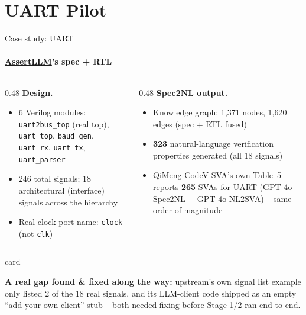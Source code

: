 \documentclass[aspectratio=169]{beamer}
\newenvironment{card}[1][\textwidth]{%
  \begin{beamercolorbox}[wd=#1,sep=8pt,rounded=true,shadow=false]{card}
}{%
  \end{beamercolorbox}
}
\begin{document}
\section{UART Pilot}

\begin{frame}{Case study: UART}
  \framesubtitle{\href{https://github.com/hkust-zhiyao/AssertLLM}{AssertLLM}'s spec + RTL}
  \begin{columns}[T]
    \begin{column}{0.48\textwidth}
      \textbf{Design.}
      \begin{itemize}
        \item 6 Verilog modules: \texttt{uart2bus\_top} (real top),
          \texttt{uart\_top}, \texttt{baud\_gen}, \texttt{uart\_rx},
          \texttt{uart\_tx}, \texttt{uart\_parser}
        \item 246 total signals; 18 architectural (interface) signals
          across the hierarchy
        \item Real clock port name: \texttt{clock} (not \texttt{clk})
      \end{itemize}
    \end{column}
    \begin{column}{0.48\textwidth}
      \textbf{Spec2NL output.}
      \begin{itemize}
        \item Knowledge graph: 1{,}371 nodes, 1{,}620 edges (spec $+$ RTL fused)
        \item \textbf{323} natural-language verification properties
          generated (all 18 signals)
        \item QiMeng-CodeV-SVA's own Table~5 reports \textbf{265} SVAs for
          UART (GPT-4o Spec2NL + GPT-4o NL2SVA) -- same order of magnitude
      \end{itemize}
    \end{column}
  \end{columns}
  \vspace{6pt}
  \begin{card}
    \scriptsize
    \textbf{A real gap found \& fixed along the way:} upstream's own
    signal list example only listed 2 of the 18 real signals, and its
    LLM-client code shipped as an empty ``add your own client'' stub --
    both needed fixing before Stage 1/2 ran end to end.
  \end{card}
\end{frame}
\end{document}
